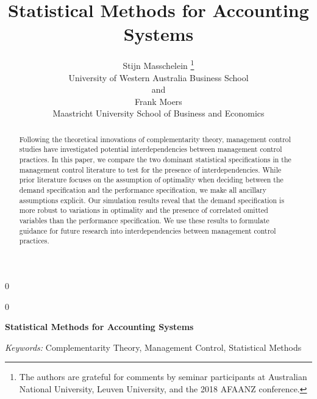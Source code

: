 \documentclass[12pt]{article}
\newcommand{\blind}{0}
\begin{document}
\def\spacingset#1{\renewcommand{\baselinestretch}%
{#1}\small\normalsize} \spacingset{1}


\blind
{
  \title{\bf Statistical Methods for Accounting Systems}

  \author{
        Stijn Masschelein \thanks{The authors are grateful for comments by seminar participants at
Australian National University, Leuven University, and the 2018 AFAANZ
conference.} \\
    University of Western Australia Business School\\
     and \\     Frank Moers \\
    Maastricht University School of Business and Economics\\
      }
  \maketitle
} \fi

\blind
{
  \bigskip
  \bigskip
  \bigskip
  \begin{center}
    {\LARGE\bf Statistical Methods for Accounting Systems}
  \end{center}
  \medskip
} \fi

\bigskip
\begin{abstract}
Following the theoretical innovations of complementarity theory, management control studies have investigated potential interdependencies between management control practices. In this paper, we compare the two dominant statistical specifications in the management control literature to test for the presence of interdependencies. While prior literature focuses on the assumption of optimality when deciding between the demand specification and the performance specification, we make all ancillary assumptions explicit. Our simulation results reveal that the demand specification is more robust to variations in optimality and the presence of correlated omitted variables than the performance specification. We use these results to formulate guidance for future research into interdependencies between management control practices.
\end{abstract}

\noindent%
{\it Keywords:} Complementarity Theory, Management Control, Statistical Methods
\vfill

\newpage

\spacingset{1.15}
\end{document}
